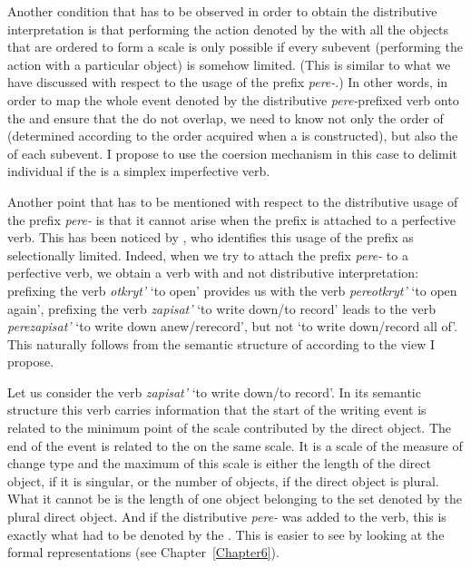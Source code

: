 Another condition that has to be observed in order to obtain the distributive interpretation is that performing the action denoted by the  with all the objects that are ordered to form a scale is only possible if every subevent (performing the action with a particular object) is somehow limited. (This is similar to what we have discussed with respect to the  usage of the prefix \textit{pere-}.) In other words, in order to map the whole event denoted by the distributive \textit{pere-}prefixed verb onto the  and ensure that the  do not overlap, we need to know not only the order of  (determined according to the order acquired when a  is constructed), but also the  of each subevent. I propose to use the coersion mechanism in this case to delimit individual  if the  is a simplex imperfective verb.

Another point that has to be mentioned with respect to the distributive usage of the prefix \textit{pere-} is that it cannot arise when the prefix is attached to a perfective verb. This has been noticed by \citet{Tatevosov:09}, who identifies this usage of the prefix as selectionally limited. Indeed, when we try to attach the prefix \textit{pere-} to a perfective verb, we obtain a verb with  and not distributive interpretation: prefixing the verb \textit{otkryt'} `to open' provides us with the verb \textit{pereotkryt'} `to open again', prefixing the verb \textit{zapisat'} `to write down/to record' leads to the verb \textit{perezapisat'} `to write down anew/rerecord', but not `to write down/record all of'. This naturally follows from the semantic structure of  according to the view I propose.

Let us consider the verb \textit{zapisat'} `to write down/to record'. In its semantic structure this verb carries information that the start of the writing event is related to the minimum point of the scale contributed by the direct object. The end of the event is related to the  on the same scale. It is a scale of the measure of change type and the maximum of this scale is either the length of the direct object, if it is singular, or the number of objects, if the direct object is plural. What it cannot be is the length of one object belonging to the set denoted by the plural direct object. And if the distributive \textit{pere-} was added to the verb, this is exactly what had to be denoted by the . This is easier to see by looking at the formal representations (see Chapter~\ref{Chapter6}).

